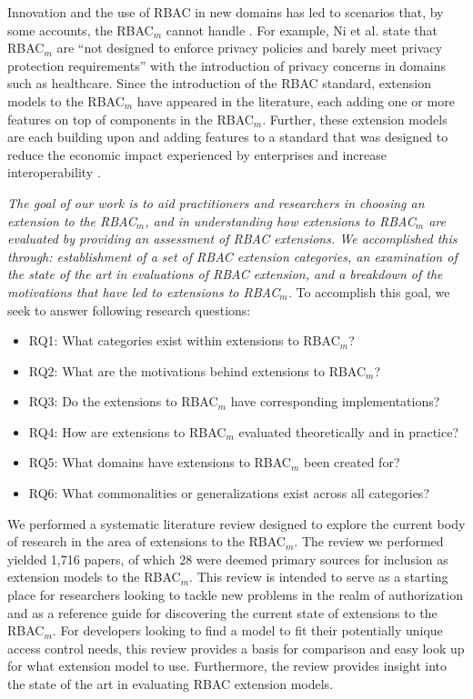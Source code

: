 Innovation and the use of RBAC in new domains has led to scenarios that, by some accounts, the RBAC$_{m}$ cannot handle \cite{kuhn2010adding}.  
For example, Ni et al. \cite{ni2010privacy} state that RBAC$_{m}$ are ``not designed to enforce privacy policies and barely 
meet privacy protection requirements'' with the introduction of privacy concerns in domains such as healthcare. 
Since the introduction of the RBAC standard, extension models to the RBAC$_{m}$ have appeared in the literature, each adding one or more features on top of components in the RBAC$_{m}$.
Further, these extension models are each building upon and adding features to a standard that was designed to reduce the economic impact experienced by enterprises and increase interoperability \cite{o20102010}.

\textit{The goal of our work is to aid practitioners and researchers in choosing an extension to the RBAC$_{m}$, and in understanding
how extensions to RBAC$_{m}$ are evaluated by providing an assessment of RBAC extensions. We accomplished this through: 
establishment of a set of RBAC extension categories, an examination of the state of the art in evaluations of RBAC extension, and a breakdown of the 
motivations that have led to extensions to RBAC$_{m}$.} To accomplish this goal, we seek to answer following research questions:

\begin{itemize}
\setlength{\itemsep}{0.25pt}
\item RQ1: What categories exist within extensions to RBAC$_{m}$?
\item RQ2: What are the motivations behind extensions to RBAC$_{m}$?
\item RQ3: Do the extensions to RBAC$_{m}$ have corresponding implementations?
\item RQ4: How are extensions to RBAC$_{m}$ evaluated theoretically and in practice?
\item RQ5: What domains have extensions to RBAC$_{m}$ been created for?
\item RQ6: What commonalities or generalizations exist across all categories?
\end{itemize}

We performed a systematic literature review designed to explore the current body of research in the area of extensions to the RBAC$_{m}$. 
The review we performed yielded 1,716 papers, of which 28 were deemed primary sources for inclusion as extension models to the RBAC$_{m}$.  
This review is intended to serve as a starting place for researchers looking to tackle new problems in the realm of authorization and as a reference guide for discovering
the current state of extensions to the RBAC$_{m}$. 
For developers looking to find a model to fit their potentially unique access control needs, this review provides a basis for comparison and easy look up for what extension model to use.  
Furthermore, the review provides insight into the state of the art in evaluating RBAC extension models.

